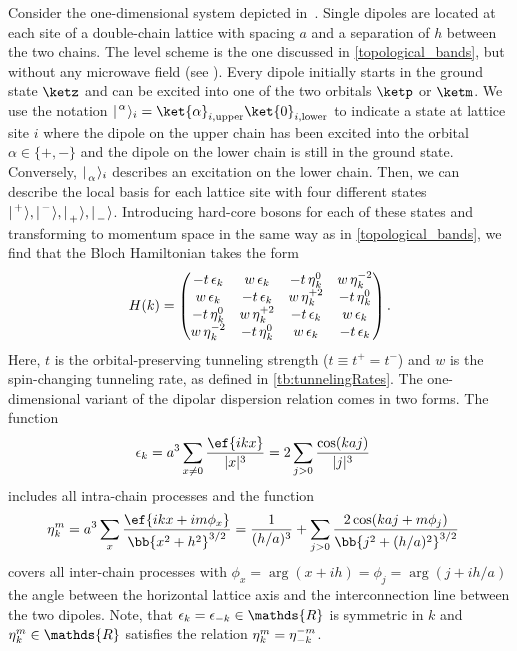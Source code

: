 Consider the one-dimensional system depicted in~.
Single dipoles are located at each site of a double-chain lattice with spacing $a$ and a separation of $h$ between the two chains.
The level scheme is the one discussed in \cref{topological_bands}, but without any microwave field (see ). Every dipole initially starts in the ground state $\ketz$ and can be excited into one of the two orbitals $\ketp$ or $\ketm$.
We use the notation $\ladderKet{\alpha}{}_i = \ket{\alpha}_{i,\text{upper}} \ket{0}_{i,\text{lower}}$ to indicate a state at lattice site $i$ where the dipole on the upper chain has been excited into the orbital $\alpha \in \{+, -\}$ and the dipole on the lower chain is still in the ground state.
Conversely, $\ladderKet{}{\alpha}_i$ describes an excitation on the lower chain.
Then, we can describe the local basis for each lattice site with four different states $\upp, \upm, \dnp, \dnm$.
Introducing hard-core bosons for each of these states and transforming to momentum space in the same way as in \cref{topological_bands}, we find that the Bloch Hamiltonian takes the form
\begin{align}
    H(k) =
    \begin{pmatrix}
        -t \operatorname{\epsilon}_k  & w \operatorname{\epsilon}_k & -t \operatorname{\eta}^0_k & w \operatorname{\eta}^{-2}_k \\
        w \operatorname{\epsilon}_k & -t \operatorname{\epsilon}_k  & w \operatorname{\eta}^{+2}_k & -t \operatorname{\eta}^0_k \\
        -t \operatorname{\eta}^0_{k} & w \operatorname{\eta}^{+2}_{k}  & -t \operatorname{\epsilon}_k  & w \operatorname{\epsilon}_k \\
        w \operatorname{\eta}^{-2}_{k} & -t \operatorname{\eta}^0_{k} & w \operatorname{\epsilon}_k & -t \operatorname{\epsilon}_k
    \end{pmatrix}.
\end{align}
Here, $t$ is the orbital-preserving tunneling strength ($t \equiv t^+ = t^-$) and $w$ is the spin-changing tunneling rate, as defined in \cref{tb:tunnelingRates}.
The one-dimensional variant of the dipolar dispersion relation comes in two forms. The function
\begin{align}
    \ep_k &= a^3 \sum_{x\ne 0} \frac{\ef{i k x}}{|x|^3} = 2 \sum_{j>0} \frac{\cos(k a j)}{|j|^3}
\end{align}
includes all intra-chain processes and the function
\begin{align}
    \et^m_k &= a^3 \sum_{x} \frac{\ef{i k x + i m \phi_x}}{\bb{x^2 + h^2}^{3/2}}
    = \frac{1}{(h/a)^3} + \sum_{j>0} \frac{2\cos(ka j+m\phi_j)}{\bb{j^2+(h/a)^2}^{3/2}}
\end{align}
covers all inter-chain processes with $\phi_x = \arg(x+ i h)=\phi_j=\arg(j+ i h/a)$ the angle between the horizontal lattice axis and the interconnection line between the two dipoles.
Note, that $\ep_k=\ep_{-k} \in \mathds{R}$ is symmetric in $k$ and $\et^m_k \in \mathds{R}$ satisfies the relation $\operatorname{\eta}^m_k=\operatorname{\eta}^{-m}_{-k}$.

